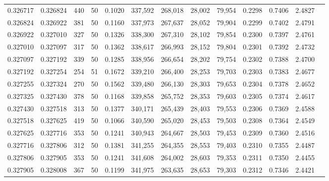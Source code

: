 \begin{tabular}{rrrrrrrrrrrrr}
0.326717 & 0.326824 &   440 &  50 &                                     0.1020 & 337,592 & 268,018 &  28,002 &  79,954 & 0.2298 & 0.7406 & 2.4827 \\
0.326824 & 0.326922 &   381 &  50 &                                     0.1160 & 337,973 & 267,637 &  28,052 &  79,904 & 0.2299 & 0.7402 & 2.4791 \\
0.326922 & 0.327010 &   327 &  50 &                                     0.1326 & 338,300 & 267,310 &  28,102 &  79,854 & 0.2300 & 0.7397 & 2.4761 \\
0.327010 & 0.327097 &   317 &  50 &                                     0.1362 & 338,617 & 266,993 &  28,152 &  79,804 & 0.2301 & 0.7392 & 2.4732 \\
0.327097 & 0.327192 &   339 &  50 &                                     0.1285 & 338,956 & 266,654 &  28,202 &  79,754 & 0.2302 & 0.7388 & 2.4700 \\
0.327192 & 0.327254 &   254 &  51 &                                     0.1672 & 339,210 & 266,400 &  28,253 &  79,703 & 0.2303 & 0.7383 & 2.4677 \\
0.327255 & 0.327324 &   270 &  50 &                                     0.1562 & 339,480 & 266,130 &  28,303 &  79,653 & 0.2304 & 0.7378 & 2.4652 \\
0.327325 & 0.327430 &   378 &  50 &                                     0.1168 & 339,858 & 265,752 &  28,353 &  79,603 & 0.2305 & 0.7374 & 2.4617 \\
0.327430 & 0.327518 &   313 &  50 &                                     0.1377 & 340,171 & 265,439 &  28,403 &  79,553 & 0.2306 & 0.7369 & 2.4588 \\
0.327518 & 0.327625 &   419 &  50 &                                     0.1066 & 340,590 & 265,020 &  28,453 &  79,503 & 0.2308 & 0.7364 & 2.4549 \\
0.327625 & 0.327716 &   353 &  50 &                                     0.1241 & 340,943 & 264,667 &  28,503 &  79,453 & 0.2309 & 0.7360 & 2.4516 \\
0.327716 & 0.327806 &   312 &  50 &                                     0.1381 & 341,255 & 264,355 &  28,553 &  79,403 & 0.2310 & 0.7355 & 2.4487 \\
0.327806 & 0.327905 &   353 &  50 &                                     0.1241 & 341,608 & 264,002 &  28,603 &  79,353 & 0.2311 & 0.7350 & 2.4455 \\
0.327905 & 0.328008 &   367 &  50 &                                     0.1199 & 341,975 & 263,635 &  28,653 &  79,303 & 0.2312 & 0.7346 & 2.4421 \\

\end{tabular}
